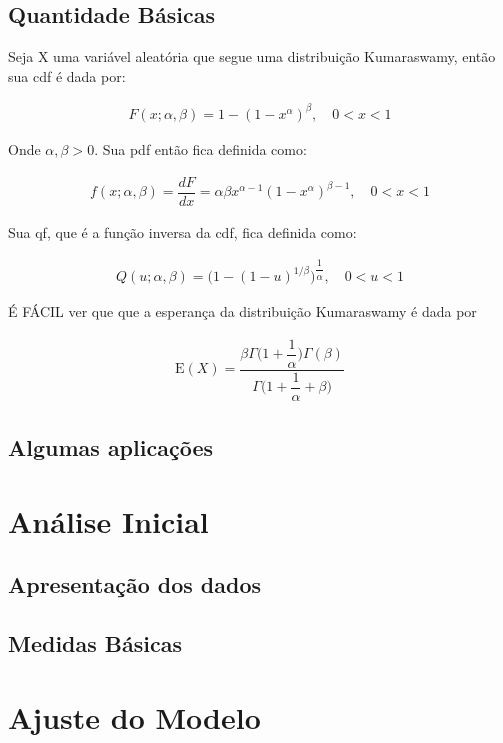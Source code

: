 \documentclass[
]{article}
\begin{document}
\subsection{Quantidade Básicas}

Seja X uma variável aleatória que segue uma distribuição Kumaraswamy,
então sua cdf é dada por:

\begin{align}
F(x;\alpha, \beta) = 1 - (1 - x^\alpha)^\beta,  \quad 0 < x< 1
\end{align}

Onde \(\alpha, \beta > 0\). Sua pdf então fica definida como:

\begin{align}
f(x;\alpha, \beta) = \dfrac{dF}{dx} =\alpha\beta x^{\alpha - 1}(1 - x^\alpha)^{\beta  - 1}, \quad 0 < x< 1
\end{align}

Sua qf, que é a função inversa da cdf, fica definida como:

\begin{align}
Q(u;\alpha, \beta) = \bigg(1 - (1 - u)^{1/\beta}\bigg)^{\dfrac{1}{\alpha}}, \quad 0<u<1
\end{align}

É FÁCIL ver que que a esperança da distribuição Kumaraswamy é dada por

\begin{align}
\text{E}(X) = \dfrac{\beta\Gamma\bigg(1 + \dfrac{1}{\alpha}\bigg)\Gamma(\beta)}{\Gamma\bigg(1 + \dfrac{1}{\alpha} + \beta\bigg)}
\end{align}

\subsection{Algumas aplicações}

\section{\centering Análise Inicial}

\subsection{Apresentação dos dados}

\subsection{Medidas Básicas}

\section{\centering Ajuste do Modelo}
\end{document}
